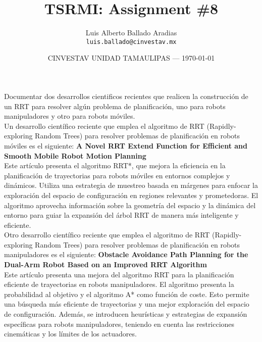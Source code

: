 \documentclass{article}
\title{TSRMI: Assignment \#8} %
\author{Luis Alberto Ballado Aradias\\ \texttt{luis.ballado@cinvestav.mx}} %
\date{CINVESTAV UNIDAD TAMAULIPAS --- \today} %
\begin{document}
\maketitle %


Documentar dos desarrollos cientificos recientes que realicen la construcción de un RRT para resolver algún problema de planificación, uno para robots manipuladores y otro para robots móviles.\\

Un desarrollo científico reciente que emplea el algoritmo de RRT (Rapidly-exploring Random Trees) para resolver problemas de planificación en robots móviles es el siguiente: \textbf{A Novel RRT Extend Function for Efficient and Smooth Mobile Robot Motion Planning}\\

Este artículo presenta el algoritmo RRT*, que mejora la eficiencia en la planificación de trayectorias para robots móviles en entornos complejos y dinámicos. Utiliza una estrategia de muestreo basada en márgenes para enfocar la exploración del espacio de configuración en regiones relevantes y prometedoras. El algoritmo aprovecha información sobre la geometría del espacio y la dinámica del entorno para guiar la expansión del árbol RRT de manera más inteligente y eficiente.\\

Otro desarrollo científico reciente que emplea el algoritmo de RRT (Rapidly-exploring Random Trees) para resolver problemas de planificación en robots manipuladores es el siguiente: \textbf{Obstacle Avoidance Path Planning for the Dual-Arm Robot Based on an Improved RRT Algorithm}\\

Este artículo presenta una mejora del algoritmo RRT para la planificación eficiente de trayectorias en robots manipuladores. El algoritmo presenta la probabilidad al objetivo y el algoritmo A* como función de coste. Esto permite una búsqueda más eficiente de trayectorias y una mejor exploración del espacio de configuración. Además, se introducen heurísticas y estrategias de expansión específicas para robots manipuladores, teniendo en cuenta las restricciones cinemáticas y los límites de los actuadores.
\end{document}
